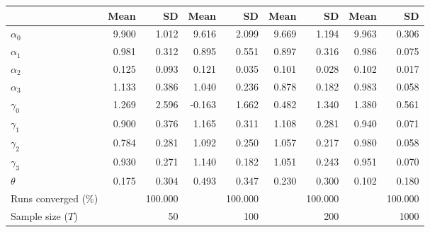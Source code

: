 
\begin{tabular}[t]{lrrrrrrrr}
\toprule
  & Mean & SD & Mean  & SD  & Mean   & SD   & Mean    & SD   \\
\midrule
$\alpha_{0}$ & 9.900 & 1.012 & 9.616 & 2.099 & 9.669 & 1.194 & 9.963 & 0.306\\
$\alpha_{1}$ & 0.981 & 0.312 & 0.895 & 0.551 & 0.897 & 0.316 & 0.986 & 0.075\\
$\alpha_{2}$ & 0.125 & 0.093 & 0.121 & 0.035 & 0.101 & 0.028 & 0.102 & 0.017\\
$\alpha_{3}$ & 1.133 & 0.386 & 1.040 & 0.236 & 0.878 & 0.182 & 0.983 & 0.058\\
$\gamma_{0}$ & 1.269 & 2.596 & -0.163 & 1.662 & 0.482 & 1.340 & 1.380 & 0.561\\
$\gamma_{1}$ & 0.900 & 0.376 & 1.165 & 0.311 & 1.108 & 0.281 & 0.940 & 0.071\\
$\gamma_{2}$ & 0.784 & 0.281 & 1.092 & 0.250 & 1.057 & 0.217 & 0.980 & 0.058\\
$\gamma_{3}$ & 0.930 & 0.271 & 1.140 & 0.182 & 1.051 & 0.243 & 0.951 & 0.070\\
$\theta$ & 0.175 & 0.304 & 0.493 & 0.347 & 0.230 & 0.300 & 0.102 & 0.180\\
Runs converged (\%) &  & 100.000 &  & 100.000 &  & 100.000 &  & 100.000\\
Sample size ($T$) &  & 50 &  & 100 &  & 200 &  & 1000\\
\bottomrule
\end{tabular}
